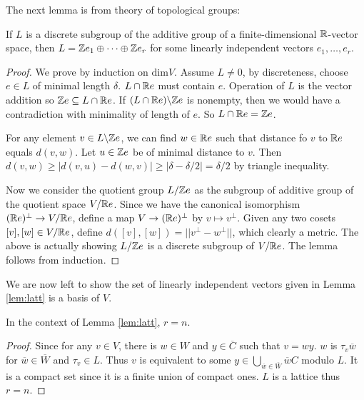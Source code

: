 \documentclass[../main.tex]{subfiles}
\begin{document}
The next lemma is from theory of topological groups:

\begin{lemma}\label{lem:latt}
    If $L$ is a discrete subgroup of the additive group of a finite-dimensional $\mathbb{R}$-vector space, then $L=\mathbb{Z} e_1\oplus\dots\oplus \mathbb{Z} e_r$ for some linearly independent vectors $e_1,\dots,e_r$. 
\end{lemma}

\begin{proof}
    We prove by induction on $\text{dim}V$. Assume $L \neq 0$, by discreteness, choose $e\in L$ of minimal length $\delta$. $L\cap \mathbb{R} e$ must contain $e$. Operation of $L$ is the vector addition so $\mathbb{Z} e \subseteq L\cap \mathbb{R} e$. If $(L\cap \mathbb{R} e) \backslash \mathbb{Z} e$ is nonempty, then we would have a contradiction with minimality of length of $e$. So $L\cap \mathbb{R} e = \mathbb{Z} e$. 

    For any element $v\in L \backslash \mathbb{Z} e$, we can find $w\in \mathbb{R} e$ such that distance fo $v$ to $\mathbb{R} e$ equals $d(v,w)$. Let $u\in\mathbb{Z} e$ be of minimal distance to $v$. Then $d(v,w)\geq |d(v,u)-d(w,v)| \geq |\delta-\delta/2|=\delta/2$ by triangle inequality.

    Now we consider the quotient group $L/\mathbb{Z} e$ as the subgroup of additive group of the quotient space $V/ \mathbb{R} e$. Since we have the canonical isomorphism $(\mathbb{R} e)^{\perp} \rightarrow V/\mathbb{R} e$, define a map $V\rightarrow (\mathbb{R} e)^{\perp}$ by $v \mapsto v^{\perp}$. Given any two cosets $[v],[w]\in V/\mathbb{R} e$, define $d([v],[w])=||v^{\perp}-w^{\perp}||$, which clearly a metric. The above is actually showing $L/\mathbb{Z} e$ is a discrete subgroup of $V/\mathbb{R} e$. The lemma follows from induction.
\end{proof}

We are now left to show the set of linearly independent vectors given in Lemma \ref{lem:latt} is a basis of $V$.

\begin{lemma}
    In the context of Lemma \ref{lem:latt}, $r=n$.
\end{lemma}

\begin{proof}
    Since for any $v\in V$, there is $w\in W$ and $y\in \overline C$ such that $v=wy$. $w$ is $\tau_v\overline w$ for $\overline w\in \overline W$ and $\tau_v\in L$. Thus $v$ is equivalent to some $y\in \bigcup_{\overline w\in\overline W}\overline wC$ modulo $L$. It is a compact set since it is a finite union of compact ones. $L$ is a lattice thus $r=n$.
\end{proof}
\end{document}
